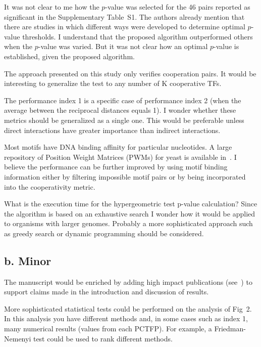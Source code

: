 \documentclass[11pt]{article}
\begin{document}
 It was not clear to me how the $p$-value was selected for the 46 pairs reported as significant in the Supplementary Table~S1. The authors already mention that there are studies in which different ways were developed to determine optimal $p$-value thresholds. I understand that the proposed algorithm outperformed others when the $p$-value was varied. But it was not clear how an optimal $p$-value is established, given the proposed algorithm.

 The approach presented on this study only verifies cooperation pairs. It would be interesting to generalize the test to any number of K cooperative TFs.

 The performance index 1 is a specific case of performance index 2 (when the average between the reciprocal distances equals 1). I wonder whether these metrics should be generalized as a single one. This would be preferable unless direct interactions have greater importance than indirect interactions.

 Most motifs have DNA binding affinity for particular nucleotides. A large repository of Position Weight Matrices (PWMs) for yeast is available in~\cite{boer2012}. I believe the performance can be further improved by using motif binding information either by filtering impossible motif pairs or by being incorporated into the cooperativity metric.

 What is the execution time for the hypergeometric test p-value calculation? Since the algorithm is based on an exhaustive search I wonder how it would be applied to organisms with larger genomes. Probably a more sophisticated approach such as greedy search or dynamic programming should be considered.

\subsection*{b. Minor}

 The manuscript would be enriched by adding high impact publications (see~\cite{martinez2012}) to support claims made in the introduction and discussion of results.

 More sophisticated statistical tests could be performed on the analysis of Fig~2. In this analysis you have different methods and, in some cases such as index 1, many numerical results (values from each PCTFP). For example, a Friedman-Nemenyi test could be used to rank different methods.
\end{document}
